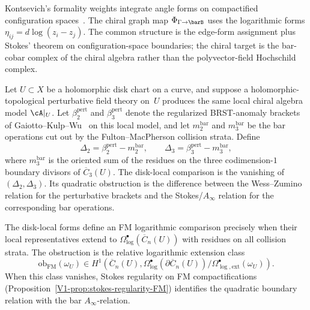 \begin{remark}
\label{rem:kontsevich-graphs}
\label{sec:connections-other-feynman}
Kontsevich's formality weights integrate angle forms on compactified
configuration spaces~\cite{Kon99}.  The chiral graph map
\(\Phi_{\Gamma\to\barB}\) uses the logarithmic forms
\(\eta_{ij}=d\log(z_i-z_j)\).  The common structure is the
edge-form assignment plus Stokes' theorem on configuration-space
boundaries; the chiral target is the bar-cobar complex of the chiral
algebra rather than the polyvector-field Hochschild complex.
\end{remark}

\begin{definition}
\label{def:disk-local-perturbative-fm}
Let $U \subset X$ be a holomorphic disk chart on a curve, and suppose a
holomorphic-topological perturbative field theory on~$U$ produces the
same local chiral algebra model \(\cA|_U\).  Let
\(\beta_2^{\mathrm{pert}}\) and \(\beta_3^{\mathrm{pert}}\) denote the
regularized BRST-anomaly brackets of Gaiotto--Kulp--Wu~\cite{GKW24}
on this local model, and let \(m_2^{\mathrm{bar}}\) and
\(m_3^{\mathrm{bar}}\) be the bar operations cut out by the
Fulton--MacPherson collision strata.  Define
\[
\Delta_2=\beta_2^{\mathrm{pert}}-m_2^{\mathrm{bar}},
\qquad
\Delta_3=\beta_3^{\mathrm{pert}}-m_3^{\mathrm{bar}},
\]
where \(m_3^{\mathrm{bar}}\) is the oriented sum of the residues on the
three codimension-\(1\) boundary divisors of \(\overline{C}_3(U)\).
The disk-local comparison is the vanishing of
\((\Delta_2,\Delta_3)\).  Its quadratic obstruction is the difference
between the Wess--Zumino relation for the perturbative brackets and the
Stokes/\(A_\infty\) relation for the corresponding bar operations.
\end{definition}

\begin{remark}\label{rem:disk-local-fm-extension}
The disk-local forms define an FM logarithmic comparison precisely when
their local representatives extend to
\(\Omega^\bullet_{\log}(\overline{C}_n(U))\) with residues on all
collision strata.  The obstruction is the relative logarithmic
extension class
\[
\mathrm{ob}_{\mathrm{FM}}(\omega_U)\in
H^1\!\left(\overline{C}_n(U),
\Omega^\bullet_{\log}(\partial\overline{C}_n(U))
/\Omega^\bullet_{\log,\mathrm{ext}}(\omega_U)\right).
\]
When this class vanishes, Stokes regularity on FM compactifications
\textup{(}Proposition~\textup{\ref{V1-prop:stokes-regularity-FM}}\textup{)}
identifies the quadratic boundary relation with the bar
\(A_\infty\)-relation.
\end{remark}

